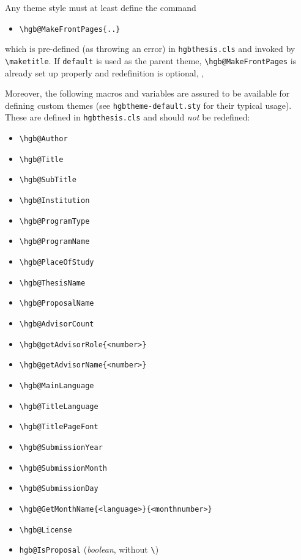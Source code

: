 \documentclass[english]{hgbarticle}
\begin{document}
Any theme style must at least define the command
\begin{itemize}
  \item[] \verb!\hgb@MakeFrontPages{..}!
\end{itemize}
which is pre-defined (as throwing an error) in \texttt{hgbthesis.cls}
and invoked by \verb!\maketitle!.
If \texttt{default} is used as the parent theme, \verb!\hgb@MakeFrontPages! 
is already set up properly and redefinition is optional, \ie,
%
\begin{LaTeXCode}[numbers=none]
\renewcommand{\hgb@MakeFrontPages}{..}	%
\end{LaTeXCode}
%

\noindent
Moreover, the following macros and variables are assured to be available for defining custom themes
(see \texttt{hgbtheme-default.sty} for their typical usage).
These are defined in \texttt{hgbthesis.cls} and should \emph{not} be redefined:
%
\begin{itemize}
  \item[] \verb!\hgb@Author!
  \item[] \verb!\hgb@Title!
  \item[] \verb!\hgb@SubTitle!
  \item[] \verb!\hgb@Institution!
  \item[] \verb!\hgb@ProgramType!
  \item[] \verb!\hgb@ProgramName!
  \item[] \verb!\hgb@PlaceOfStudy!
\medskip
	\item[] \verb!\hgb@ThesisName!
	\item[] \verb!\hgb@ProposalName!
\medskip
  \item[] \verb!\hgb@AdvisorCount!
  \item[] \verb!\hgb@getAdvisorRole{<number>}!
  \item[] \verb!\hgb@getAdvisorName{<number>}!
\medskip
  \item[] \verb!\hgb@MainLanguage!
  \item[] \verb!\hgb@TitleLanguage!
  \item[] \verb!\hgb@TitlePageFont!
\medskip 
  \item[] \verb!\hgb@SubmissionYear!
  \item[] \verb!\hgb@SubmissionMonth!
  \item[] \verb!\hgb@SubmissionDay!
  \item[] \verb!\hgb@GetMonthName{<language>}{<monthnumber>}!
\medskip
	\item[] \verb!\hgb@License!
\medskip
  \item[] \verb!hgb@IsProposal! (\emph{boolean}, without \verb!\!)
\end{itemize}
\end{document}
